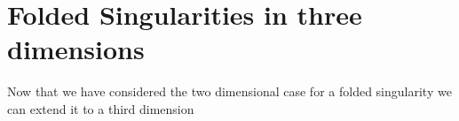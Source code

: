 \section{Folded Singularities in three dimensions}
Now that we have considered the two dimensional case for a folded singularity we can extend it to a third dimension